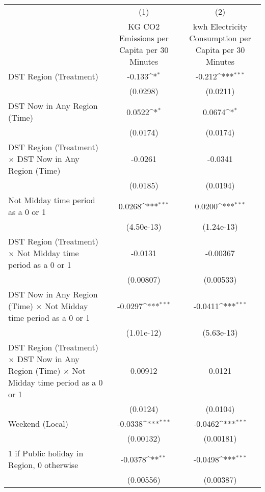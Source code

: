 {
\def\sym#1{\ifmmode^{#1}\else\(^{#1}\)\fi}
\begin{tabular}{l*{2}{c}}
\hline\hline
                    &\multicolumn{1}{c}{(1)}&\multicolumn{1}{c}{(2)}\\
                    &\multicolumn{1}{c}{KG CO2 Emissions per Capita per 30 Minutes}&\multicolumn{1}{c}{kwh Electricity Consumption per Capita per 30 Minutes}\\
\hline
DST Region (Treatment)&      -0.133\sym{*}  &      -0.212\sym{***}\\
                    &    (0.0298)         &    (0.0211)         \\
[1em]
DST Now in Any Region (Time)&      0.0522\sym{*}  &      0.0674\sym{*}  \\
                    &    (0.0174)         &    (0.0174)         \\
[1em]
DST Region (Treatment) $\times$ DST Now in Any Region (Time)&     -0.0261         &     -0.0341         \\
                    &    (0.0185)         &    (0.0194)         \\
[1em]
Not Midday time period as a 0 or 1&      0.0268\sym{***}&      0.0200\sym{***}\\
                    &  (4.50e-13)         &  (1.24e-13)         \\
[1em]
DST Region (Treatment) $\times$ Not Midday time period as a 0 or 1&     -0.0131         &    -0.00367         \\
                    &   (0.00807)         &   (0.00533)         \\
[1em]
DST Now in Any Region (Time) $\times$ Not Midday time period as a 0 or 1&     -0.0297\sym{***}&     -0.0411\sym{***}\\
                    &  (1.01e-12)         &  (5.63e-13)         \\
[1em]
DST Region (Treatment) $\times$ DST Now in Any Region (Time) $\times$ Not Midday time period as a 0 or 1&     0.00912         &      0.0121         \\
                    &    (0.0124)         &    (0.0104)         \\
[1em]
Weekend (Local)     &     -0.0338\sym{***}&     -0.0462\sym{***}\\
                    &   (0.00132)         &   (0.00181)         \\
[1em]
1 if Public holiday in Region, 0 otherwise&     -0.0378\sym{**} &     -0.0498\sym{***}\\
                    &   (0.00556)         &   (0.00387)         \\

\end{tabular}}
